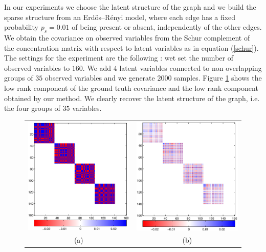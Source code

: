 \documentclass[letterpaper]{article}
\begin{document}
In our experiments we choose the latent structure of the graph and we build the sparse structure from an Erd\"os–R\'enyi model, where each edge has a fixed probability $p_{s}=0.01$ of being present or absent, independently of the other edges. We obtain the covariance on observed variables from the Schur complement of the concentration matrix with respect to latent variables as in equation (\ref{schur}). The settings for the experiment are the following : wet set the number of observed variables to $160$. We add $4$ latent variables connected to non overlapping groups of $35$ observed variables and we generate $2000$ samples. Figure \ref{fig:synthlarge} shows the low rank component of the ground truth covariance and the low rank component obtained by our method. We clearly recover the latent structure of the graph, i.e. the four groups of $35$ variables. \\


\begin{figure}
\label{fig:synthlarge}
\center
\begin{tabular}{cc}
    \includegraphics[width=.4\linewidth]{fig/M} 
  & \includegraphics[width=.4\linewidth]{fig/outputM} 
   \\    (a) & (b) \\[6pt]
\end{tabular}
\caption{}
\end{figure}
\end{document}

